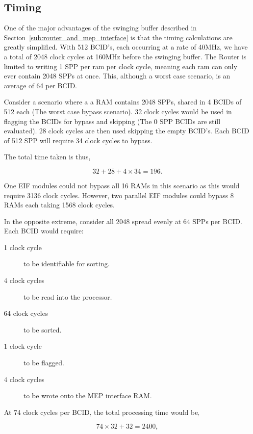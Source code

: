 	\subsection{Timing} %
	\label{sub:timing}
	
		One of the major advantages of the swinging buffer described in Section~\ref{sub:router_and_mep_interface} is that the timing calculations are greatly simplified.
		With 512 BCID's, each occurring at a rate of 40MHz, we have a total of 2048 clock cycles at 160MHz before the swinging buffer.
		The Router is limited to writing 1 SPP per ram per clock cycle, meaning each ram can only ever contain 2048 SPPs at once.
		This, although a worst case scenario, is an average of 64 per BCID.

		Consider a scenario where a a RAM contains 2048 SPPs, shared in 4 BCIDs of 512 each (The worst case bypass scenario). 
		32 clock cycles would be used in flagging the BCIDs for bypass and skipping (The 0 SPP BCIDs are still evaluated).
		28 clock cycles are then used skipping the empty BCID's.
		Each BCID of 512 SPP will require 34 clock cycles to bypass.

		The total time taken is thus,

		\begin{equation}
			32 + 28 + 4 \times 34 = 196.
		\end{equation}

		One EIF modules could not bypass all 16 RAMs in this scenario as this would require 3136 clock cycles.
		However, two parallel EIF modules could bypass 8 RAMs each taking 1568 clock cycles.

		In the opposite extreme, consider all 2048 spread evenly at 64 SPPs per BCID.
		Each BCID would require:

		\begin{description}
			\item [1 clock cycle] to be identifiable for sorting.
			\item [4 clock cycles] to be read into the processor.
			\item [64 clock cycles] to be sorted.
			\item [1 clock cycle] to be flagged.
			\item [4 clock cycles] to be wrote onto the MEP interface RAM.
		\end{description}
		
		At 74 clock cycles per BCID, the total processing time would be,

		\begin{equation}
			74 \times 32 + 32 = 2400,
		\end{equation}

